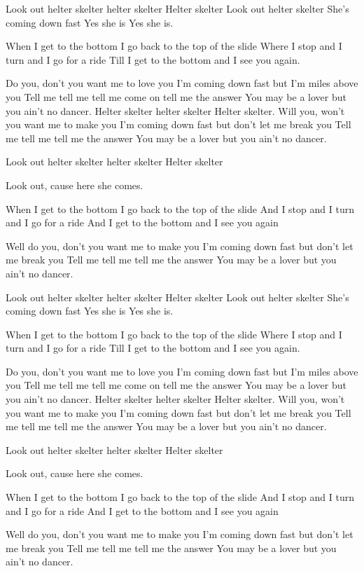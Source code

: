 \documentclass[vruler,JCS]{COB}
\begin{document}
Look out helter skelter helter skelter
Helter skelter
Look out helter skelter
She's coming down fast 
Yes she is 
Yes she is.

When I get to the bottom I go back to the top of the slide
Where I stop and I turn and I go for a ride
Till I get to the bottom and I see you again.

Do you, don't you want me to love you
I'm coming down fast but I'm miles above you
Tell me tell me tell me come on tell me the answer
You may be a lover but you ain't no dancer.
Helter skelter helter skelter
Helter skelter.
Will you, won't you want me to make you
I'm coming down fast but don't let me break you
Tell me tell me tell me the answer
You may be a lover but you ain't no dancer.

Look out helter skelter helter skelter
Helter skelter 

Look out, cause here she comes.

When I get to the bottom I go back to the top of the slide
And I stop and I turn and I go for a ride
And I get to the bottom and I see you again

Well do you, don't you want me to make you
I'm coming down fast but don't let me break you
Tell me tell me tell me the answer
You may be a lover but you ain't no dancer.

Look out helter skelter helter skelter
Helter skelter
Look out helter skelter
She's coming down fast 
Yes she is 
Yes she is.

When I get to the bottom I go back to the top of the slide
Where I stop and I turn and I go for a ride
Till I get to the bottom and I see you again.

Do you, don't you want me to love you
I'm coming down fast but I'm miles above you
Tell me tell me tell me come on tell me the answer
You may be a lover but you ain't no dancer.
Helter skelter helter skelter
Helter skelter.
Will you, won't you want me to make you
I'm coming down fast but don't let me break you
Tell me tell me tell me the answer
You may be a lover but you ain't no dancer.

Look out helter skelter helter skelter
Helter skelter 

Look out, cause here she comes.

When I get to the bottom I go back to the top of the slide
And I stop and I turn and I go for a ride
And I get to the bottom and I see you again

Well do you, don't you want me to make you
I'm coming down fast but don't let me break you
Tell me tell me tell me the answer
You may be a lover but you ain't no dancer.
\end{document}
